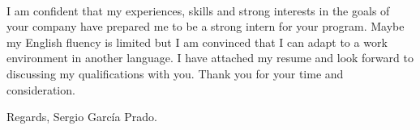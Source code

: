 \documentclass{friggeri-cv}
\begin{document}
  \paragraph{}
  I am confident that my experiences, skills and strong interests in the goals of your company have prepared me to be a strong intern for your program. Maybe my English fluency is limited but I am convinced that I can adapt to a work environment in another language. I have attached my resume and look forward to discussing my qualifications with you. Thank you for your time and consideration.

  \vspace{10mm}

  \noindent Regards,
  \newline Sergio García Prado.
\end{document}
